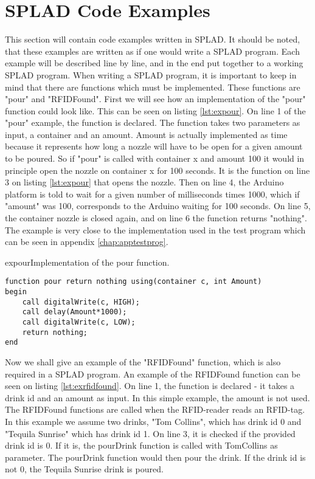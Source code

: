 \section{SPLAD Code Examples}
This section will contain code examples written in SPLAD. It should be noted, that these examples are written as if one would write a SPLAD program. Each example will be described line by line, and in the end put together to a working SPLAD program.
When writing a SPLAD program, it is important to keep in mind that there are functions which must be implemented. These functions are "pour" and "RFIDFound". First we will see how an implementation of the "pour" function could look like. This can be seen on listing \ref{lst:expour}. On line 1 of the "pour" example, the function is declared. The function takes two parameters as input, a container and an amount. Amount is actually implemented as time because it represents how long a nozzle will have to be open for a given amount to be poured. So if "pour" is called with container x and amount 100 it would in principle open the nozzle on container x for 100 seconds. It is the function on line 3 on listing \ref{lst:expour} that opens the nozzle. Then on line 4, the Arduino platform is told to wait for a given number of milliseconds times 1000, which if "amount" was 100, corresponds to the Arduino waiting for 100 seconds. On line 5, the container nozzle is closed again, and on line 6 the function returns "nothing". The example is very close to the implementation used in the test program which can be seen in appendix \ref{chap:apptestprog}.

\begin{code}{expour}{Implementation of the pour function.}
\begin{lstlisting}
function pour return nothing using(container c, int Amount)
begin
	call digitalWrite(c, HIGH);
	call delay(Amount*1000);
	call digitalWrite(c, LOW);
	return nothing;
end
\end{lstlisting}
\end{code}

Now we shall give an example of the "RFIDFound" function, which is also required in a SPLAD program. An example of the RFIDFound function can be seen on listing \ref{lst:exrfidfound}. On line 1, the function is declared - it takes a drink id and an amount as input. In this simple example, the amount is not used. The RFIDFound functions are called when the RFID-reader reads an RFID-tag. In this example we assume two drinks, "Tom Collins", which has drink id 0 and "Tequila Sunrise" which has drink id 1. On line 3, it is checked if the provided drink id is 0. If it is, the pourDrink function is called with TomCollins as parameter. The pourDrink function would then pour the drink. If the drink id is not 0, the Tequila Sunrise drink is poured.   

